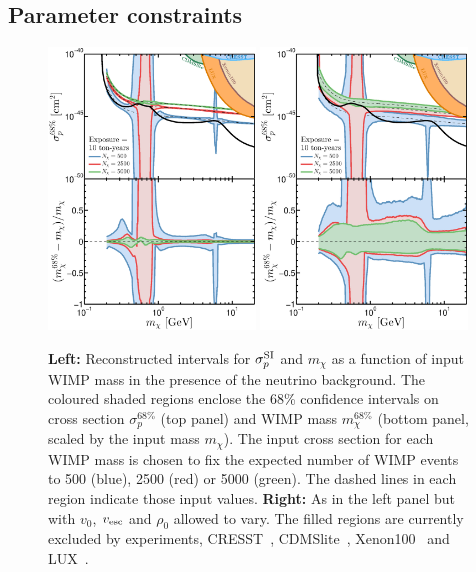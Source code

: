 \subsection{Parameter constraints}\label{sec:nufloor_parcon}
\begin{figure}
\begin{center}
\includegraphics[trim = 5mm 0 0mm 0mm, clip, width=0.49\textwidth,angle=0]{Figures/error_recon.eps}
\includegraphics[trim = 5mm 0 0mm 0mm, clip, width=0.49\textwidth,angle=0]{Figures/error_recon_Maxwell.eps}
\caption[Parameters reconstruction under the neutrino background]{{\bf Left:} Reconstructed intervals for $\sigma^{\rm SI}_p$ and $m_\chi$ as a function of input WIMP mass in the presence of the neutrino background. The coloured shaded regions enclose the 68\% confidence intervals on cross section $\sigma^{68\%}_p$ (top panel) and WIMP mass $m^{68\%}_\chi$ (bottom panel, scaled by the input mass $m_\chi$). The input cross section for each WIMP mass is chosen to fix the expected number of WIMP events to 500 (blue), 2500 (red) or 5000 (green). The dashed lines in each region indicate those input values. {\bf Right:} As in the left panel but with $v_0$, $v_{\rm esc}$ and $\rho_0$ allowed to vary. The filled regions are currently excluded by experiments, CRESST~\cite{Angloher:2015ewa}, CDMSlite~\cite{Agnese:2015nto}, Xenon100~\cite{Aprile:2012nq} and LUX~\cite{Akerib:2016vxi}.}
\label{fig:error_recon}
\end{center}
\end{figure} 
